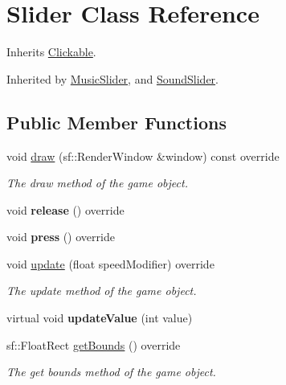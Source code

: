 \hypertarget{class_slider}{\section{Slider Class Reference}
\label{class_slider}
}


Inherits \hyperlink{class_clickable}{Clickable}.



Inherited by \hyperlink{class_music_slider}{Music\+Slider}, and \hyperlink{class_sound_slider}{Sound\+Slider}.

\subsection*{Public Member Functions}
\begin{DoxyCompactItemize}
\item 
void \hyperlink{class_slider_a5693b04af04da09cff43647283efaf6e}{draw} (sf\+::\+Render\+Window \&window) const override
\begin{DoxyCompactList}\small\item\em The draw method of the game object. \end{DoxyCompactList}\item 
\hypertarget{class_slider_ac1cb7218b21febfe4dffecc0055427ac}{void {\bfseries release} () override}\label{class_slider_ac1cb7218b21febfe4dffecc0055427ac}

\item 
\hypertarget{class_slider_a39223f6d54b6a517dea6cd842d34ecd7}{void {\bfseries press} () override}\label{class_slider_a39223f6d54b6a517dea6cd842d34ecd7}

\item 
void \hyperlink{class_slider_a762b3a7ca00a3a665a1aeceba2e54fac}{update} (float speed\+Modifier) override
\begin{DoxyCompactList}\small\item\em The update method of the game object. \end{DoxyCompactList}\item 
\hypertarget{class_slider_a5275d7ee0fa30d49b01a5f3ec376bcbe}{virtual void {\bfseries update\+Value} (int value)}\label{class_slider_a5275d7ee0fa30d49b01a5f3ec376bcbe}

\item 
sf\+::\+Float\+Rect \hyperlink{class_slider_a3ca5a06f3165d1bce77408f367abba50}{get\+Bounds} () override
\begin{DoxyCompactList}\small\item\em The get bounds method of the game object. \end{DoxyCompactList}\end{DoxyCompactItemize}
